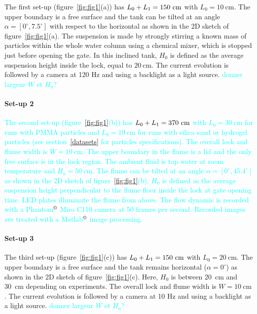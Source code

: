 \documentclass[twocolumn]{article}
\newcommand*{\marie}{\textcolor{Cyan}}
\newcommand*{\jean}{\textcolor{jeanc}}
\begin{document}
The first set-up (figure~\ref{fig:fig1}(a)) has $L_0+L_1=150~\textup{cm}$ with $L_0 = 10~\textrm{cm}$. The upper boundary is a free surface and the tank can be tilted at an angle $\alpha=[0^\circ,7.5^\circ]$ with respect to the horizontal as shown in the 2D sketch of figure~\ref{fig:fig1}(a). The suspension is made by strongly stirring a known mass of particles within the whole water column using a chemical mixer, which is stopped just before opening the gate. In this inclined tank, $H_{0}$ is defined as the average suspension height inside the lock, equal to $20~\textrm{cm}$.
%
The current evolution is followed by a camera at 120 Hz and using a backlight as a light source.
\marie{donner largeur $W$ et $H_a$?}

\paragraph{Set-up 2}
\marie{The second set-up (figure~\ref{fig:fig1}(b)) has $L_0+L_1=370~\textup{cm}$ with $L_0 = 30~\textrm{cm}$ for runs with PMMA particles and $L_0 = 10~\textrm{cm}$ for runs with silica sand or hydrogel particles (see section~\ref{datasets} for particles specifications). The overall lock and flume width is $W= 10~\textrm{cm}$. The
upper boundary in the flume is a lid and the only free surface is in the lock region. The ambient fluid is tap water at room temperature and $H_a=50~\textrm{cm}$. The flume can be tilted at an angle $\alpha =[0^\circ,45.4^\circ]$ as shown in the 2D sketch of figure~\ref{fig:fig1}(b). $H_0$ is defined as the average suspension height perpendicular to the flume floor inside the lock at gate opening time. LED plates illuminate the flume from above. The flow dynamic is recorded with a Phantom$^\copyright$ Miro C110 camera at 50 frames per second. Recorded images are treated with a Matlab$^\copyright$ image processing.}


\paragraph{Set-up 3}

\jean{The third set-up (figure~\ref{fig:fig1}(c)) has $L_0+L_1=150~\textup{cm}$ with $L_0 = 20~\textrm{cm}$. The upper boundary is a free surface and the tank remains horizontal ($\alpha = 0^\circ$) as shown in the 2D sketch of figure~\ref{fig:fig1}(c). Here, $H_{0}$ is between 20~cm and 30~cm depending on experiments. The overall lock and flume width is $W= 10~\textrm{cm}$. The current evolution is followed by a camera at 10 Hz and using a backlight as a light source.}
\marie{donner largeur $W$ et $H_a$?}
\end{document}
